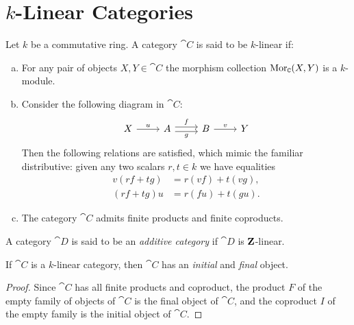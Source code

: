 \section{\texorpdfstring{\(k\)}{k}-Linear Categories}

\begin{definition}
    \label{def:k-linear-category}
    Let \(k\) be a commutative ring. A category \(\cat C\) is said to be
    \(k\)-linear if:
    \begin{enumerate}[(a)]\setlength\itemsep{0em}
        \item For any pair of objects \(X, Y \in \cat C\) the morphism collection
              \(\operatorname{Mor}_{\texttt C}(X, Y)\) is a \(k\)-module.

        \item Consider the following diagram in \(\cat C\):
              \[
                  \begin{tikzcd}
                      X \ar[r, "u"]
                      &A \ar[r, shift left, "f"] \ar[r, shift right, "g"']
                      &B \ar[r, "v"]
                      &Y
                  \end{tikzcd}
              \]
              Then the following relations are satisfied, which mimic the familiar
              distributive: given any two scalars \(r, t \in k\) we have equalities
              \begin{align*}
                  v (r f + t g) & = r (v f) + t (v g), \\
                  (r f + t g) u & = r (f u) + t (g u).
              \end{align*}

        \item The category \(\cat C\) admits finite products and finite coproducts.
    \end{enumerate}
    A category \(\cat D\) is said to be an \emph{additive category} if \(\cat D\) is
    \(\mathbf{Z}\)-linear.
\end{definition}

\begin{corollary}
    \label{cor:k-linear-has-initial-and-final-obj}
    If \(\cat C\) is a \(k\)-linear category, then \(\cat C\) has an \emph{initial}
    and \emph{final} object.
\end{corollary}

\begin{proof}
    Since \(\cat C\) has all finite products and coproduct, the product \(F\) of the
    empty family of objects of \(\cat C\) is the final object of \(\cat C\), and the
    coproduct \(I\) of the empty family is the initial object of \(\cat C\).
\end{proof}

